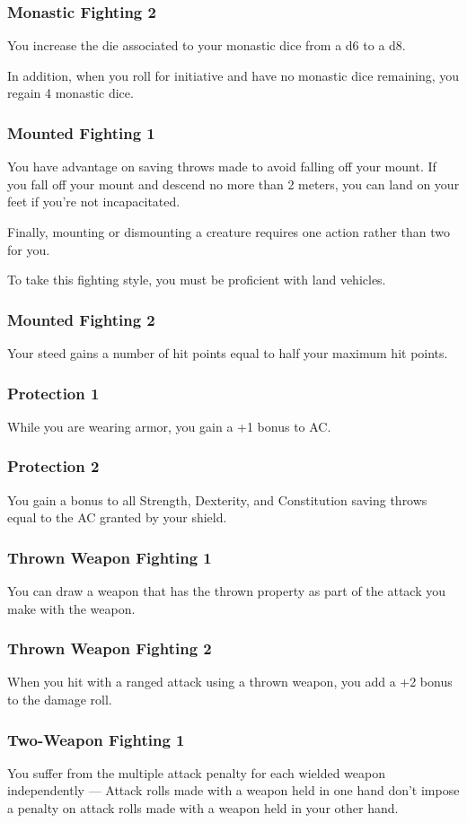     \subsubsection{Monastic Fighting 2}
        You increase the die associated to your monastic dice from a d6 to a d8.

        In addition, when you roll for initiative and have no monastic dice remaining, you regain 4 monastic dice.
    \subsubsection{Mounted Fighting 1}
        You have advantage on saving throws made to avoid falling off your mount.
        If you fall off your mount and descend no more than 2 meters, you can land on your feet if you're not incapacitated.

        Finally, mounting or dismounting a creature requires one action rather than two for you.

        To take this fighting style, you must be proficient with land vehicles.
    \subsubsection{Mounted Fighting 2}
        Your steed gains a number of hit points equal to half your maximum hit points.
    \subsubsection{Protection 1}
        While you are wearing armor, you gain a +1 bonus to AC.
    \subsubsection{Protection 2}
        You gain a bonus to all Strength, Dexterity, and Constitution saving throws equal to the AC granted by your shield.
    \subsubsection{Thrown Weapon Fighting 1}
        You can draw a weapon that has the thrown property as part of the attack you make with the weapon.
    \subsubsection{Thrown Weapon Fighting 2}
        When you hit with a ranged attack using a thrown weapon, you add a +2 bonus to the damage roll.
    \subsubsection{Two-Weapon Fighting 1}
        You suffer from the multiple attack penalty for each wielded weapon independently --- Attack rolls made with a weapon held in one hand don't impose a penalty on attack rolls made with a weapon held in your other hand.
